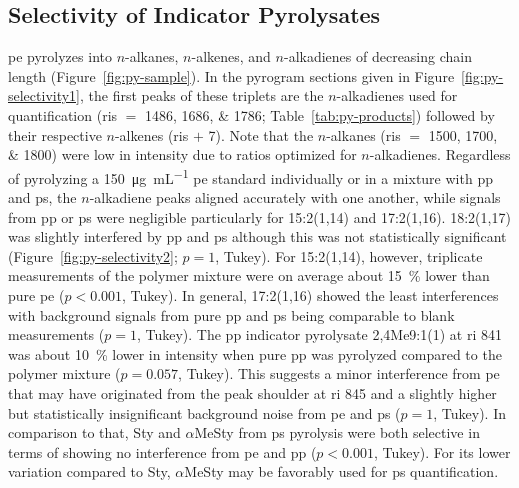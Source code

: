 \subsection{Selectivity of Indicator Pyrolysates}\label{sec:selectivity}

\Ac{pe} pyrolyzes into $n$-alkanes, $n$-alkenes, and $n$-alkadienes of decreasing chain length (Figure~\ref{fig:py-sample}). In the pyrogram sections given in Figure~\ref{fig:py-selectivity1}, the first peaks of these triplets are the $n$-alkadienes used for quantification (\acp{ri} $=$ \numlist{1486;1686;1786}; Table~\ref{tab:py-products}) followed by their respective $n$-alkenes (\acp{ri} $+$ \num{7}). Note that the $n$-alkanes (\acp{ri} $=$ \numlist{1500;1700;1800}) were low in intensity due to \si{\mz} ratios optimized for $n$-alkadienes.
Regardless of pyrolyzing a \SI{150}{\micro\gram\per\milli\liter} \ac{pe} standard individually or in a mixture with \ac{pp} and \ac{ps}, the $n$-alkadiene peaks aligned accurately with one another, while signals from \ac{pp} or \ac{ps} were negligible particularly for 15:2(1,14) and 17:2(1,16). 18:2(1,17) was slightly interfered by \ac{pp} and \ac{ps} although this was not statistically significant (Figure~\ref{fig:py-selectivity2}; $p = 1$, Tukey). For 15:2(1,14), however, triplicate measurements of the polymer mixture were on average about \SI{15}{\percent} lower than pure \ac{pe} ($p < 0.001$, Tukey). In general, 17:2(1,16) showed the least interferences with background signals from pure \ac{pp} and \ac{ps} being comparable to blank measurements ($p = 1$, Tukey).
The \ac{pp} indicator pyrolysate 2,4Me9:1(1) at \ac{ri} \num{841} was about \SI{10}{\percent} lower in intensity when pure \ac{pp} was pyrolyzed compared to the polymer mixture ($p = 0.057$, Tukey). This suggests a minor interference from \ac{pe} that may have originated from the peak shoulder at \ac{ri} 845 and a slightly higher but statistically insignificant background noise from \ac{pe} and \ac{ps} ($p = 1$, Tukey).
In comparison to that, Sty and $\alpha$MeSty from \ac{ps} pyrolysis were both selective in terms of showing no interference from \ac{pe} and \ac{pp} ($p < 0.001$, Tukey). For its lower variation compared to Sty, $\alpha$MeSty may be favorably used for \ac{ps} quantification.

